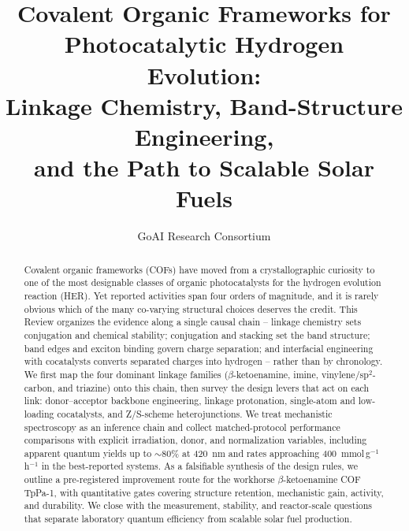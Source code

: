 \documentclass[11pt]{article}
\title{Covalent Organic Frameworks for Photocatalytic Hydrogen Evolution:\\
Linkage Chemistry, Band-Structure Engineering,\\
and the Path to Scalable Solar Fuels}
\author{GoAI Research Consortium}
\date{}
\begin{document}
\maketitle

\begin{abstract}
Covalent organic frameworks (COFs) have moved from a crystallographic
curiosity to one of the most designable classes of organic photocatalysts for
the hydrogen evolution reaction (HER). Yet reported activities span four
orders of magnitude, and it is rarely obvious which of the many co-varying
structural choices deserves the credit. This Review organizes the evidence
along a single causal chain -- linkage chemistry sets conjugation and chemical
stability; conjugation and stacking set the band structure; band edges and
exciton binding govern charge separation; and interfacial engineering with
cocatalysts converts separated charges into hydrogen -- rather than by
chronology. We first map the four dominant linkage families
($\beta$-ketoenamine, imine, vinylene/sp$^2$-carbon, and triazine) onto this
chain, then survey the design levers that act on each link: donor--acceptor
backbone engineering, linkage protonation, single-atom and low-loading
cocatalysts, and Z/S-scheme heterojunctions. We treat mechanistic
spectroscopy as an inference chain and collect matched-protocol performance
comparisons with explicit irradiation, donor, and normalization variables,
including apparent quantum yields up to $\sim$80\% at 420~nm and rates
approaching 400~mmol\,g$^{-1}$\,h$^{-1}$ in the best-reported systems. As a
falsifiable synthesis of the design rules, we outline a pre-registered
improvement route for the workhorse $\beta$-ketoenamine COF TpPa-1, with
quantitative gates covering structure retention, mechanistic gain, activity,
and durability. We close with the measurement, stability, and reactor-scale
questions that separate laboratory quantum efficiency from scalable solar
fuel production.
\end{abstract}










\clearpage



\end{document}
